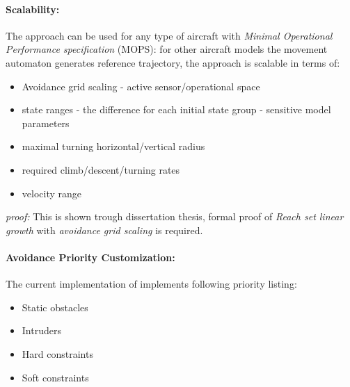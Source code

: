 \paragraph{Scalability:} The approach can be used for any type of aircraft with \emph{Minimal Operational Performance specification} (MOPS): for other aircraft models the movement automaton generates reference trajectory, the approach is scalable in terms of:
\begin{itemize}
    \item Avoidance grid scaling - active sensor/operational space
    \item state ranges - the difference for each initial state group - sensitive model parameters
    \item maximal turning horizontal/vertical radius
    \item required climb/descent/turning rates
    \item velocity range
\end{itemize}

\emph{proof:} This is shown trough dissertation thesis, formal proof of \emph{Reach set linear growth} with \emph{avoidance grid scaling} is required.

\paragraph{Avoidance Priority Customization:} The current implementation of implements following priority listing:
\begin{itemize}
    \item Static obstacles
    \item Intruders
    \item Hard constraints
    \item Soft constraints
\end{itemize}


